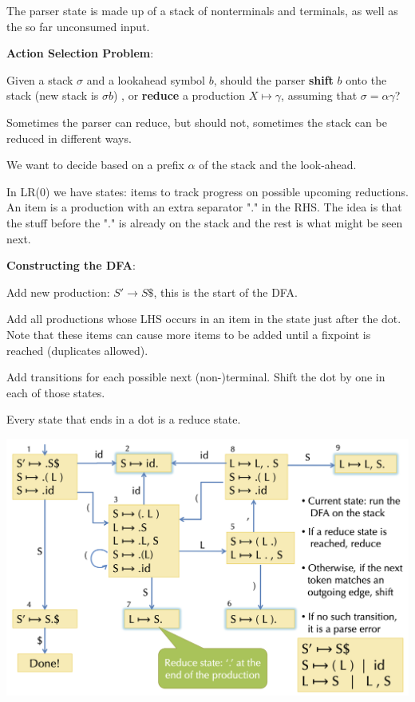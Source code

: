 The parser state is made up of a stack of nonterminals and terminals, as well as the so far unconsumed input.\medskip

\textbf{Action Selection Problem}:
\begin{compactitem}[$\quad\bullet$]
	\item Given a stack $\sigma$ and a lookahead symbol $b$, should the parser \textbf{shift} $b$ onto the stack (new stack is $\sigma b$) , or \textbf{reduce} a production $X \mapsto \gamma$, assuming that $\sigma = \alpha \gamma$?

	\item Sometimes the parser can reduce, but should not, sometimes the stack can be reduced in different ways.
\end{compactitem}

We want to decide based on a prefix $\alpha$ of the stack and the look-ahead. \medskip

In LR(0) we have states: items to track progress on possible upcoming reductions. An item is a production with an extra separator "." in the RHS. The idea is that the stuff before the "." is already on the stack and the rest is what might be seen next. \medskip

\textbf{Constructing the DFA}:
\begin{compactitem}[$\quad\bullet$]
	\item Add new production: $S' \to S\$$, this is the start of the DFA.

	\item Add all productions whose LHS occurs in an item in the state just after the dot. Note that these items can cause more items to be added until a fixpoint is reached (duplicates allowed).

	\item Add transitions for each possible next (non-)terminal. Shift the dot by one in each of those states.

	\item Every state that ends in a dot is a reduce state.
\end{compactitem}
\vspace{-10pt}
\begin{center}
	\includegraphics[width=0.8\linewidth]{assets/dfa.png}
\end{center}
\vspace{-10pt}

